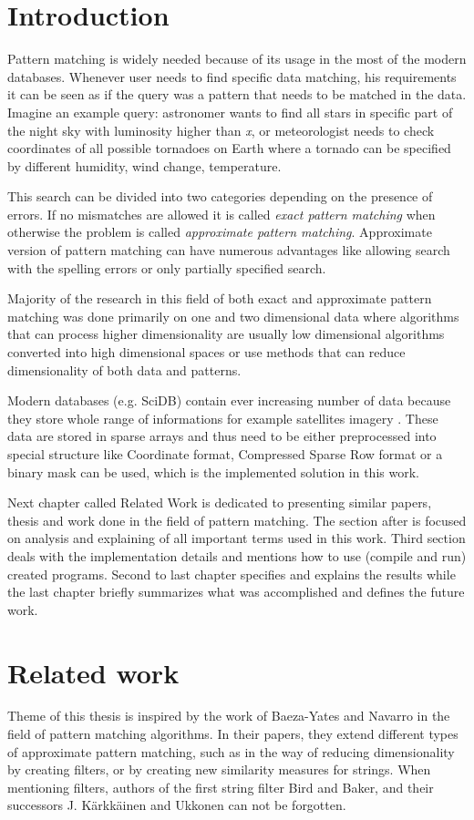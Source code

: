 
\chapter{Introduction}
Pattern matching is widely needed because of its usage in the most of the modern databases. Whenever user needs to find specific data matching, his requirements it can be seen as if the query was a pattern that needs to be matched in the data. Imagine an example query: astronomer wants to find all stars in specific part of the night sky with luminosity higher than \textit{x}, or meteorologist needs to check coordinates of all possible tornadoes on Earth where a tornado can be specified by different humidity, wind change, temperature. \cite{detectRivers}

This search can be divided into two categories depending on the presence of errors. If no mismatches are allowed it is called \textit{exact pattern matching} when otherwise the problem is called \textit{approximate pattern matching}. Approximate version of pattern matching can have numerous advantages like allowing search with the spelling errors or only partially specified search. 

Majority of the research in this field of both exact and approximate pattern matching was done primarily on one and two dimensional data where algorithms that can process higher dimensionality are usually low dimensional algorithms converted into high dimensional spaces or use methods that can reduce dimensionality of both data and patterns.

Modern databases (e.g. SciDB) contain ever increasing number of data because they store whole range of informations for example satellites imagery \cite{scidbarch}. These data are stored in sparse arrays and thus need to be either preprocessed into special structure like Coordinate format, Compressed Sparse Row format or a binary mask can be used, which is the implemented solution in this work.

Next chapter called Related Work is dedicated to presenting similar papers, thesis and work done in the field of pattern matching. The section after is focused on analysis and explaining of all important terms used in this work. Third section deals with the implementation details and mentions how to use (compile and run) created programs. Second to last chapter specifies and explains the results while the last chapter briefly summarizes what was accomplished and defines the future work.

\chapter{Related work}
Theme of this thesis is inspired by the work of Baeza-Yates and Navarro in the field of pattern matching algorithms. In their papers, they extend different types of approximate pattern matching, such as in the way of reducing dimensionality by creating filters, or by creating new similarity measures for strings. When mentioning filters, authors of the first string filter Bird and Baker, and their successors J. K{\" a}rkk{\" a}inen and Ukkonen can not be forgotten.

